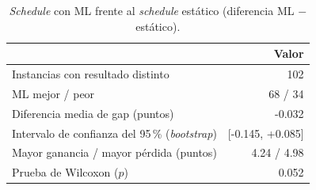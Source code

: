 \begin{table}[H]
  \centering
  \small
  \singlespacing
  \caption{\textit{Schedule} con ML frente al \textit{schedule} estático (diferencia ML $-$ estático).}
  \label{tab:ml_vs_estatico}
  \begin{tabular}{lr}
    \toprule
     & Valor \\
    \midrule
    Instancias con resultado distinto & 102 \\
    ML mejor / peor & 68 / 34 \\
    Diferencia media de gap (puntos) & -0.032 \\
    Intervalo de confianza del 95\,\% (\textit{bootstrap}) & [-0.145, +0.085] \\
    Mayor ganancia / mayor pérdida (puntos) & 4.24 / 4.98 \\
    Prueba de Wilcoxon ($p$) & 0.052 \\
    \bottomrule
  \end{tabular}
\end{table}
